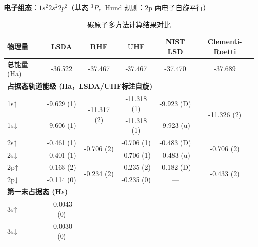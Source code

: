 \documentclass[12pt,a4paper]{article}
\begin{document}
\textbf{电子组态}：$1s^2 2s^2 2p^2$（基态 $^3P$，Hund 规则：2p 两电子自旋平行）

\begin{table}[H]
    \centering
    \caption{碳原子多方法计算结果对比}
    \begin{tabular}{lccccc}
        \toprule
        \textbf{物理量}           & \textbf{LSDA} & \textbf{RHF}                 & \textbf{UHF} & \textbf{NIST LSD} & \textbf{Clementi-Roetti}     \\
        \midrule
        总能量 (Ha)               & -36.522       & -37.467                      & -37.467      & -37.470           & -37.689                      \\
        \midrule
        \multicolumn{6}{l}{\textbf{占据态轨道能级 (Ha，LSDA/UHF标注自旋)}}                                                                                  \\
        1s↑                    & -9.629 (1)    & \multirow{2}{*}{-11.317 (2)} & -11.318 (1)  & -9.923 (D)        & \multirow{2}{*}{-11.326 (2)} \\
        1s↓                    & -9.606 (1)    &                              & -11.318 (1)  & -9.923 (u)        &                              \\
        2s↑                    & -0.461 (1)    & \multirow{2}{*}{-0.706 (2)}  & -0.706 (1)   & -0.483 (D)        & \multirow{2}{*}{-0.706 (2)}  \\
        2s↓                    & -0.401 (1)    &                              & -0.706 (1)   & -0.483 (u)        &                              \\
        2p↑                    & -0.168 (2)    & \multirow{2}{*}{-0.234 (2)}  & -0.235 (2)   & -0.182 (D)        & \multirow{2}{*}{-0.433 (2)}  \\
        \rowcolor{gray!20} 2p↓ & -0.114 (0)    &                              & -0.235 (0)   & ---               &                              \\
        \midrule
        \multicolumn{6}{l}{\textbf{第一未占据态 (Ha)}}                                                                                                \\
        \rowcolor{gray!20} 3s↑ & -0.0043 (0)   & ---                          & ---          & ---               & ---                          \\
        \rowcolor{gray!20} 3s↓ & -0.0030 (0)   & ---                          & ---          & ---               & ---                          \\
        \bottomrule
    \end{tabular}
\end{table}
\end{document}
